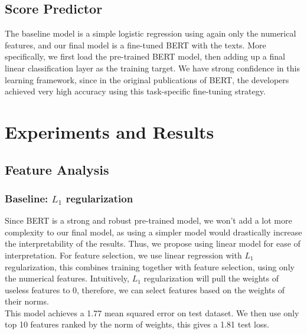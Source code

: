 \documentclass{article}
\begin{document}
\subsection{Score Predictor}
The baseline model is a simple logistic regression using again only the numerical features, and our final model is a fine-tuned BERT with the texts. More specifically, we first load the pre-trained BERT model, then adding up a final linear classification layer as the training target. We have strong confidence in this learning framework, since in the original publications of BERT, the developers achieved very high accuracy using this task-specific fine-tuning strategy.



\section{Experiments and Results}

\subsection{Feature Analysis}
\subsubsection{Baseline: $L_1$ regularization}
Since BERT is a strong and robust pre-trained model, we won’t add a lot more complexity to our final model, as using a simpler model would drastically increase the interpretability of the results. Thus, we propose using linear model for ease of interpretation. For feature selection, we use linear regression with $L_1$ regularization, this combines training together with feature selection, using only the numerical features. Intuitively, $L_1$ regularization will pull the weights of useless features to 0, therefore, we can select features based on the weights of their norms.\cite{1} \\

This model achieves a 1.77 mean squared error on test dataset. We then use only top 10 features ranked by the norm of weights, this gives a 1.81 test loss.
\end{document}
